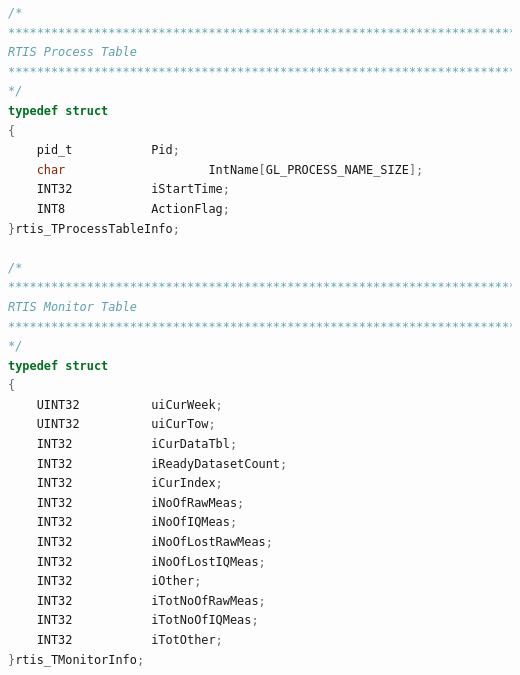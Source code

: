 \documentclass{themeensg}
\begin{document}
\newevenpage
\begin{appendices}
\label{beginappendices}

\label{structures}

\begin{lstlisting}[language=C]
/*
*******************************************************************************
RTIS Process Table
*******************************************************************************
*/
typedef struct
{
	pid_t 			Pid;
	char	 	    		IntName[GL_PROCESS_NAME_SIZE];
	INT32			iStartTime;
	INT8 			ActionFlag;
}rtis_TProcessTableInfo;

/*
*******************************************************************************
RTIS Monitor Table
*******************************************************************************
*/
typedef struct
{
	UINT32			uiCurWeek;
	UINT32			uiCurTow;
	INT32			iCurDataTbl;
	INT32			iReadyDatasetCount;
	INT32			iCurIndex;
	INT32			iNoOfRawMeas;
	INT32			iNoOfIQMeas;
	INT32			iNoOfLostRawMeas;
	INT32			iNoOfLostIQMeas;
	INT32			iOther;
	INT32			iTotNoOfRawMeas;
	INT32			iTotNoOfIQMeas;
	INT32			iTotOther;
}rtis_TMonitorInfo;


\end{lstlisting}

\label{configfile}



\label{SOW}


\label{satref}



\end{appendices}
\end{document}
